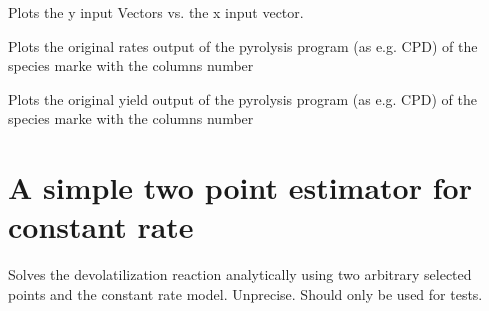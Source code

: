 \documentclass[letterpaper,10pt,english]{sphinxmanual}
\begin{document}
\begin{fulllineitems}
\begin{fulllineitems}
\label{FittingClasses:FitInfo.Fit_one_run.plt_InputVectors}
Plots the y input Vectors vs. the x input vector.

\end{fulllineitems}


\begin{fulllineitems}
\label{FittingClasses:FitInfo.Fit_one_run.plt_RateVsTime}
Plots the original rates output of the pyrolysis program (as e.g. CPD) of the species marke with the columns number

\end{fulllineitems}


\begin{fulllineitems}
\label{FittingClasses:FitInfo.Fit_one_run.plt_YieldVsTime}
Plots the original yield output of the pyrolysis program (as e.g. CPD) of the species marke with the columns number

\end{fulllineitems}


\end{fulllineitems}



\section{A simple two point estimator for constant rate}
\label{FittingClasses:a-simple-two-point-estimator-for-constant-rate}

\begin{fulllineitems}
\label{FittingClasses:Fitter.TwoPointEstimator}
Solves the devolatilization reaction analytically using two arbitrary selected points and the constant rate model. Unprecise. Should only be used for tests.

\end{fulllineitems}
\end{document}
